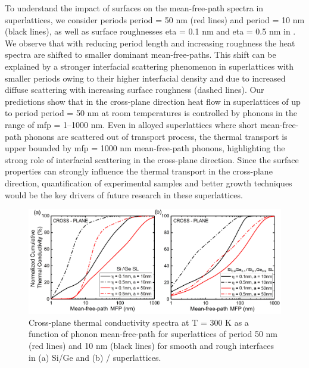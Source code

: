 \par To understand the impact of surfaces on the mean-free-path spectra in superlattices, we consider periods \gls{period} = 50 nm (red lines) and \gls{period} = 10 nm (black lines), as well as surface roughnesses \gls{eta} = 0.1 nm and \gls{eta} = 0.5 nm in . We observe that with reducing period length and increasing roughness the heat spectra are shifted to smaller dominant mean-free-paths. This shift can be explained by a stronger interfacial scattering phenomenon in superlattices with smaller periods owing to their higher interfacial density and due to increased diffuse scattering with increasing surface roughness (dashed lines). Our predictions show that in the cross-plane direction heat flow in superlattices of up to period \gls{period} = 50 nm at room temperatures is controlled by phonons in the range of \gls{mfp} = 1–1000 nm. Even in alloyed superlattices where short mean-free-path phonons are scattered out of transport process, the thermal transport is upper bounded by \gls{mfp} = 1000 nm mean-free-path phonons, highlighting the strong role of interfacial scattering in the cross-plane direction. Since the surface properties can strongly influence the thermal transport in the cross-plane direction, quantification of experimental samples and better growth techniques would be the key drivers of future research in these superlattices.
\begin{figure}[hbt]
  \centering \includegraphics[width=1.0\textwidth]{figures/ch6/Fig9.jpg}
  \caption{Cross-plane thermal conductivity spectra at \gls{T} = 300 K as a function of phonon mean-free-path for superlattices of period 50 nm (red lines) and 10 nm (black lines) for smooth and rough interfaces in (a) Si/Ge and (b) / superlattices.}
  \label{fig:ch6-9}
\end{figure}

